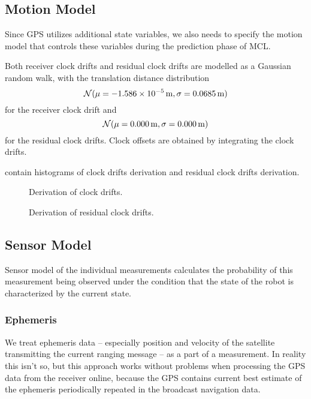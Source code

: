 \subsection{Motion Model}
Since GPS utilizes additional state variables, we also needs to specify the motion
model that controls  these variables during the prediction phase of MCL.

Both receiver clock drifts and residual clock drifts are modelled as a Gaussian random walk,
with the translation distance distribution
\begin{equation}
\operatorname{\mathcal{N}}(\mu = \SI{-1.586e-05}{\meter}, \sigma = \SI{0.0685}{\meter})
\end{equation}
for the receiver clock drift and 
\begin{equation}
\operatorname{\mathcal{N}}(\mu = \SI{0.000}{\meter}, \sigma = \SI{0.000}{\meter})
\end{equation}
for the residual clock drifts.
Clock offsets are obtained by integrating the clock drifts.

contain histograms of clock drifts derivation and residual
clock drifts derivation.

\begin{figure}[p]
	\centering
	\caption{Derivation of clock drifts.}
	\label{fig:clock-drift-derivation}
\end{figure}

\begin{figure}[p]
	\centering
	\caption{Derivation of residual clock drifts.}
	\label{fig:residual-clock-drift-derivation}
\end{figure}


\subsection{Sensor Model}
Sensor model of the individual measurements calculates the probability of this
measurement being observed under the condition that the state of the robot
is characterized by the current state.

\subsubsection{Ephemeris}
We treat ephemeris data -- especially position and velocity of the satellite transmitting
the current ranging message -- as a part of a measurement.
In reality this isn't so, but
this approach works without problems when processing the GPS data from the receiver online,
because the GPS contains current best estimate of the ephemeris periodically repeated
in the broadcast navigation data.


